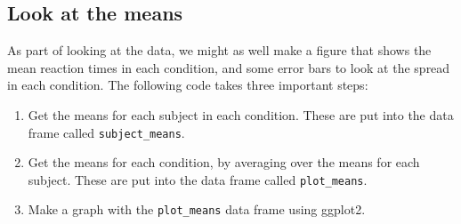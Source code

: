 \documentclass[]{book}
\providecommand{\tightlist}{%
  \setlength{\itemsep}{0pt}\setlength{\parskip}{0pt}}
\begin{document}
\subsection{Look at the means}\label{look-at-the-means}

As part of looking at the data, we might as well make a figure that
shows the mean reaction times in each condition, and some error bars to
look at the spread in each condition. The following code takes three
important steps:

\begin{enumerate}
\def\labelenumi{\arabic{enumi}.}
\tightlist
\item
  Get the means for each subject in each condition. These are put into
  the data frame called \texttt{subject\_means}.
\item
  Get the means for each condition, by averaging over the means for each
  subject. These are put into the data frame called
  \texttt{plot\_means}.
\item
  Make a graph with the \texttt{plot\_means} data frame using ggplot2.
\end{enumerate}
\end{document}
